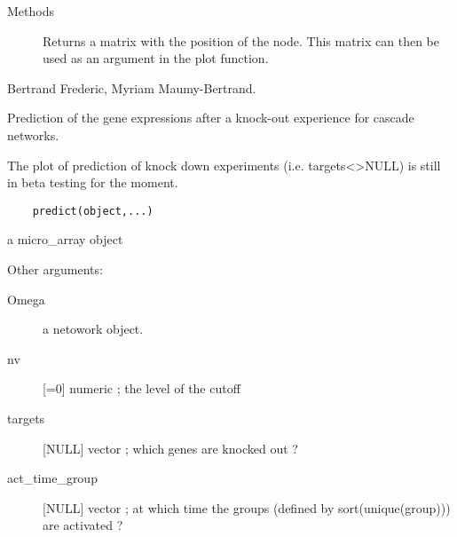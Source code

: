 \documentclass[a4paper]{book}
\begin{document}
%
\begin{Section}{Methods}
\begin{description}


\item[] 
Returns a matrix with the position of the node. This matrix can then be used as an argument in the plot function.


\end{description}
\end{Section}
%
\begin{Author}\relax
Bertrand Frederic, Myriam Maumy-Bertrand.
\end{Author}
%
\begin{Description}\relax
Prediction of the gene expressions after a knock-out experience for cascade networks.

The plot of prediction of knock down experiments (i.e. targets<>NULL) is still in beta testing for the moment.
\end{Description}
%
\begin{Usage}
\begin{verbatim}
	predict(object,...)
\end{verbatim}
\end{Usage}
%
\begin{Arguments}
\begin{ldescription}
\item[\code{object}] a micro\_array object
\item[\code{...}] Other arguments: 
\begin{description}

\item[Omega] a netowork object.
\item[nv]  [=0] numeric ; the level of the cutoff	
\item[targets]  [NULL] vector ; which genes are knocked out ?
\item[act\_time\_group]  [NULL] vector ; at which time the groups (defined by sort(unique(group))) are activated ?

\end{description}


\end{ldescription}
\end{Arguments}
\end{document}
